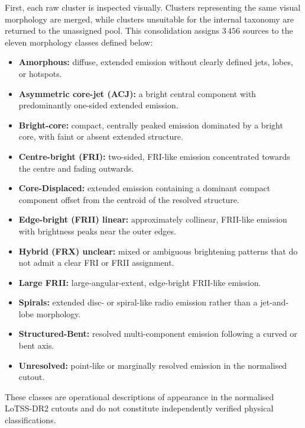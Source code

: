First, each raw cluster is inspected visually. Clusters representing the same visual morphology are merged,
while clusters unsuitable for the internal taxonomy are returned to the unassigned pool.
This consolidation assigns \(3\,456\) sources to the eleven morphology classes defined below:
\begin{itemize}[leftmargin=*]
\item \textbf{Amorphous:} diffuse, extended emission without clearly defined jets, lobes, or hotspots.
\item \textbf{Asymmetric core-jet (ACJ):} a bright central component with predominantly one-sided extended emission.
\item \textbf{Bright-core:} compact, centrally peaked emission dominated by a bright core, with faint or absent extended structure.
\item \textbf{Centre-bright (FRI):} two-sided, FRI-like emission concentrated towards the centre and fading outwards.
\item \textbf{Core-Displaced:} extended emission containing a dominant compact component offset from the centroid of the resolved structure.
\item \textbf{Edge-bright (FRII) linear:} approximately collinear, FRII-like emission with brightness peaks near the outer edges.
\item \textbf{Hybrid (FRX) unclear:} mixed or ambiguous brightening patterns that do not admit a clear FRI or FRII assignment.
\item \textbf{Large FRII:} large-angular-extent, edge-bright FRII-like emission.
\item \textbf{Spirals:} extended disc- or spiral-like radio emission rather than a jet-and-lobe morphology.
\item \textbf{Structured-Bent:} resolved multi-component emission following a curved or bent axis.
\item \textbf{Unresolved:} point-like or marginally resolved emission in the normalised cutout.
\end{itemize}
These classes are operational descriptions of appearance in the normalised LoTSS-DR2 cutouts and do not constitute independently verified physical classifications.

